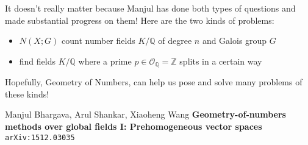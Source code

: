 \documentclass[12pt]{article}
\begin{document}
It doesn't really matter because Manjul has done both types of questions and made substantial progress on them! Here are the two kinds of problems:
\begin{itemize}
\item $N(X; G)$ count number fields $K/\mathbb{Q}$ of degree $n$ and Galois group $G$ 
\item find fields $K/\mathbb{Q}$ where a prime $p \in \mathcal{O}_\mathbb{Q} = \mathbb{Z}$ splits in a certain way
\end{itemize}
Hopefully, {\color{green!50!orange} Geometry of Numbers}, can help us pose and solve many problems of these kinds!

\vfill

\begin{thebibliography}{}
\item Manjul Bhargava, Arul Shankar, Xiaoheng Wang \textbf{Geometry-of-numbers methods over global fields I: Prehomogeneous vector spaces} \texttt{arXiv:1512.03035}
\end{thebibliography}

\newpage
\end{document}
